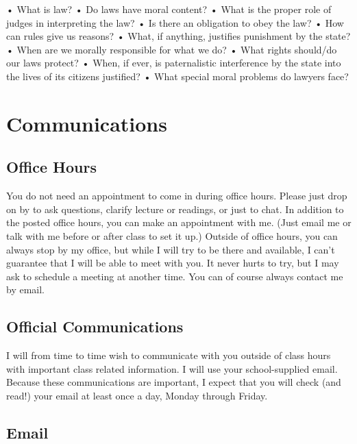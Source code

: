 \documentclass[11pt,]{article}
\begin{document}
• What is law? • Do laws have moral content? • What is the proper role
of judges in interpreting the law? • Is there an obligation to obey the
law? • How can rules give us reasons? • What, if anything, justifies
punishment by the state? • When are we morally responsible for what we
do? • What rights should/do our laws protect? • When, if ever, is
paternalistic interference by the state into the lives of its citizens
justified? • What special moral problems do lawyers face?

\section{Communications}\label{communications}

\subsection{Office Hours}\label{office-hours}

You do not need an appointment to come in during office hours. Please
just drop on by to ask questions, clarify lecture or readings, or just
to chat. In addition to the posted office hours, you can make an
appointment with me. (Just email me or talk with me before or after
class to set it up.) Outside of office hours, you can always stop by my
office, but while I will try to be there and available, I can't
guarantee that I will be able to meet with you. It never hurts to try,
but I may ask to schedule a meeting at another time. You can of course
always contact me by email.

\subsection{Official Communications}\label{official-communications}

I will from time to time wish to communicate with you outside of class
hours with important class related information. I will use your
school-supplied email. Because these communications are important, I
expect that you will check (and read!) your email at least once a day,
Monday through Friday.

\subsection{Email}\label{email}
\end{document}
